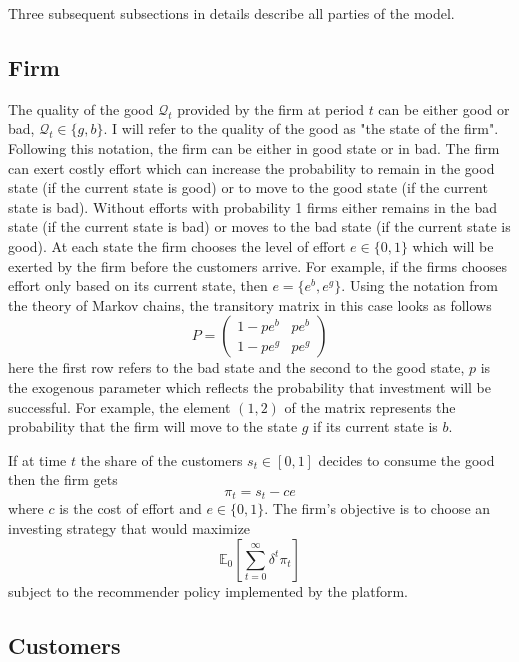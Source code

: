 \documentclass[a4paper]{article}
\newcommand{\expect}{\mathbb{E}}
\begin{document}
	
	
	Three subsequent subsections in details describe all parties of the model.
	\subsection{Firm}
	The quality of the good $\mathcal{Q}_t$ provided by the firm at period $t$ can be either good or bad, $\mathcal{Q}_t \in \{g, b\}$. I will refer to the quality of the good as "the state of the firm". Following this notation, the firm can be either in good state or in bad. The firm can exert costly effort which can increase the probability to remain in the good state (if the current state is good) or to move to the good state (if the current state is bad). Without efforts with probability 1 firms either remains in the bad state (if the current state is bad) or moves to the bad state (if the current state is good). At each state the firm chooses the level of effort $e\in\{0, 1\}$ which will be exerted by the firm before the customers arrive. For example, if the firms chooses effort only based on its current state, then $e = \{e^b, e^g\}$. Using the notation from the theory of Markov chains, the transitory matrix in this case looks as follows $$P = \begin{pmatrix}
	1 - pe^{b} & pe^{b}\\
	1-pe^{g} & pe^{g}
	\end{pmatrix}$$
	here the first row refers to the bad state and the second to the good state, $p$ is the exogenous parameter which reflects the probability that investment will be successful. For example, the element $(1, 2)$ of the matrix represents the probability that the firm will move to the state $g$ if its current state is $b$. 
	
	
	
	If at time $t$ the share of the customers $s_t \in [0, 1]$ decides to consume the good then the firm gets $$\pi_t = s_t - ce$$ where $c$ is the cost of effort and $e \in \{0, 1\}$. The firm's objective is to choose an investing strategy that would maximize $$\expect_0\left[\sum_{t=0}^{\infty} \delta^t \pi_t \right]$$ subject to the recommender policy implemented by the platform.
	\subsection{Customers}
	
\end{document}
